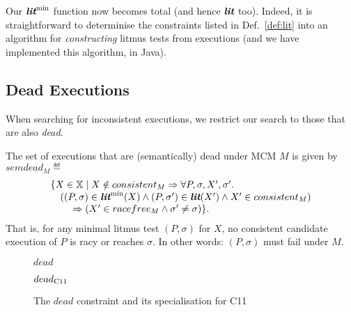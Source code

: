 Our $\textbf{\itshape lit}^{\rm min}$ function now becomes total (and hence $\textbf{\itshape lit}$ too).
Indeed, it is straightforward to determinise the constraints listed in
Def.~\ref{def:lit} into an algorithm for
\emph{constructing} litmus tests from executions (and we have
implemented this algorithm, in Java).

\subsection{Dead Executions}
\label{sec:safety}

When searching for inconsistent executions, we restrict our search to those that are also
\emph{dead}. 

\begin{definition} The set of executions that are
(semantically) dead under MCM $M$ is given by $semdead_M \eqdef {}$
%
\[
\stack{\{X\in\Exec \mid X \notin consistent_M \Rightarrow \forall P,\sigma,X',\sigma'\ldotp {}\\
\quad ((P,\sigma)\in\litmax(X) \wedge (P,\sigma')\in\lit(X') \wedge X' \in
consistent_M) \\
\quad\quad {} \Rightarrow (X' \in racefree_M \wedge \sigma'\neq\sigma)\}.}
\]
%
That is, for any minimal litmus test $(P,\sigma)$ for $X$,
no consistent candidate execution of $P$ is racy or reaches
$\sigma$. In other words: $(P,\sigma)$ must fail under $M$.
\end{definition}
%


\begin{figure}
\begin{myFrame}{$dead$}
\end{myFrame}
\par\vspace*{-2mm}
\begin{myFrame}{$dead_{\rm C11}$}
\end{myFrame}
\caption{The $dead$ constraint and its specialisation for C11}
\label{fig:c11dead}
\end{figure}

